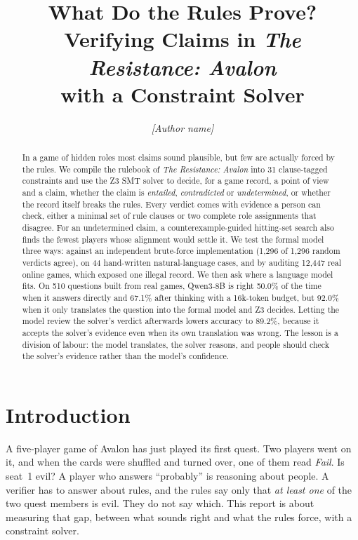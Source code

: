 \documentclass[runningheads]{llncs}
\newcommand{\vd}[1]{\emph{#1}}             %
\begin{document}
\title{What Do the Rules Prove?\\ Verifying Claims in \emph{The Resistance: Avalon}\\ with a Constraint Solver}
\author{\textit{[Author name]}}
\maketitle

\begin{abstract}
In a game of hidden roles most claims sound plausible, but few are actually forced by the rules.
We compile the rulebook of \emph{The Resistance: Avalon} into 31 clause-tagged constraints and use the Z3 SMT solver
to decide, for a game record, a point of view and a claim, whether the claim is \vd{entailed},
\vd{contradicted} or \vd{undetermined}, or whether the record itself breaks the rules.
Every verdict comes with evidence a person can check, either a minimal set of rule clauses or two complete role
assignments that disagree. For an undetermined claim, a counterexample-guided hitting-set search also finds the
fewest players whose alignment would settle it.
We test the formal model three ways: against an independent brute-force implementation
(1,296 of 1,296 random verdicts agree), on 44 hand-written natural-language cases, and by auditing 12,447 real online
games, which exposed one illegal record.
We then ask where a language model fits. On 510 questions built from real games, Qwen3-8B is right 50.0\% of the
time when it answers directly and 67.1\% after thinking with a 16k-token budget, but 92.0\% when it only translates
the question into the formal model and Z3 decides. Letting the model review the solver's verdict afterwards lowers
accuracy to 89.2\%, because it accepts the solver's evidence even when its own translation was wrong.
The lesson is a division of labour: the model translates, the solver reasons, and people should check the solver's
evidence rather than the model's confidence.
\end{abstract}

\section{Introduction}
A five-player game of Avalon has just played its first quest. Two players went on it, and when the cards were
shuffled and turned over, one of them read \emph{Fail}. Is seat~1 evil?
A player who answers ``probably'' is reasoning about people. A verifier has to answer about rules, and the rules
say only that \emph{at least one} of the two quest members is evil. They do not say which.
This report is about measuring that gap, between what sounds right and what the rules force, with a
constraint solver.
\end{document}
